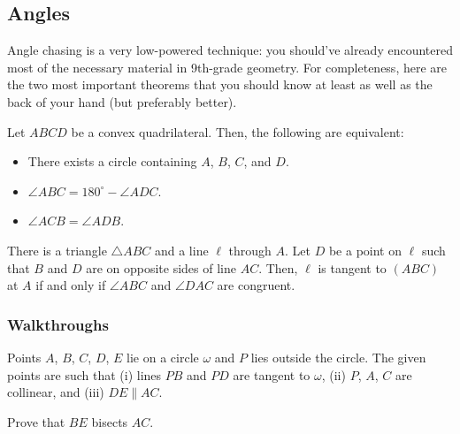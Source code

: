 \documentclass{scrartcl}
\providecommand{\dg}{^\circ}
\providecommand{\ii}{\item}
\begin{document}
\subsection{Angles}
Angle chasing is a very low-powered technique:
you should've already encountered most of the necessary material
in 9th-grade geometry.
For completeness, here are the two most important theorems that
you should know at least as well as the back of your hand
(but preferably better).

\begin{theorem}
	Let $ABCD$ be a convex quadrilateral. Then, the following are equivalent:
	\begin{itemize}
		\ii There exists a circle containing $A$, $B$, $C$, and $D$.
		\ii $\angle ABC = 180\dg - \angle ADC$.
		\ii $\angle ACB = \angle ADB$.
	\end{itemize}
\end{theorem}

\begin{theorem}
	There is a triangle $\triangle ABC$ and a line $\ell$ through $A$.
	Let $D$ be a point on $\ell$ such that $B$ and $D$ are on opposite sides
	of line $AC$.
	Then, $\ell$ is tangent to $(ABC)$ at $A$ if and only if
	$\angle ABC$ and $\angle DAC$ are congruent.
\end{theorem}

\subsubsection{Walkthroughs}
\begin{example}[JMO 2011/5]
	Points $A$, $B$, $C$, $D$, $E$ lie on a circle $\omega$
	and $P$ lies outside the circle. The given points are such that
	(i) lines $PB$ and $PD$ are tangent to $\omega$,
	(ii) $P$, $A$, $C$ are collinear, and
	(iii) $DE\parallel AC$.
	
	Prove that $BE$ bisects $AC$.
\end{example}
\end{document}
